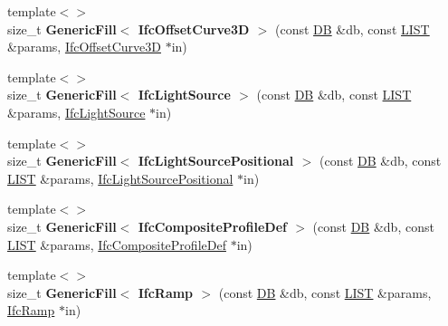 \begin{DoxyCompactItemize}
\item 
\hypertarget{namespace_assimp_1_1_s_t_e_p_a4b07bb8d7784fd60a1053da72e8eb514}{{\footnotesize template$<$$>$ }\\size\+\_\+t {\bfseries Generic\+Fill$<$ Ifc\+Offset\+Curve3\+D $>$} (const \hyperlink{class_assimp_1_1_s_t_e_p_1_1_d_b}{D\+B} \&db, const \hyperlink{class_assimp_1_1_s_t_e_p_1_1_e_x_p_r_e_s_s_1_1_l_i_s_t}{L\+I\+S\+T} \&params, \hyperlink{struct_assimp_1_1_i_f_c_1_1_ifc_offset_curve3_d}{Ifc\+Offset\+Curve3\+D} $\ast$in)}\label{namespace_assimp_1_1_s_t_e_p_a4b07bb8d7784fd60a1053da72e8eb514}

\item 
\hypertarget{namespace_assimp_1_1_s_t_e_p_ad3ce6554ccb2e2461064e4d268cf5f3a}{{\footnotesize template$<$$>$ }\\size\+\_\+t {\bfseries Generic\+Fill$<$ Ifc\+Light\+Source $>$} (const \hyperlink{class_assimp_1_1_s_t_e_p_1_1_d_b}{D\+B} \&db, const \hyperlink{class_assimp_1_1_s_t_e_p_1_1_e_x_p_r_e_s_s_1_1_l_i_s_t}{L\+I\+S\+T} \&params, \hyperlink{struct_assimp_1_1_i_f_c_1_1_ifc_light_source}{Ifc\+Light\+Source} $\ast$in)}\label{namespace_assimp_1_1_s_t_e_p_ad3ce6554ccb2e2461064e4d268cf5f3a}

\item 
\hypertarget{namespace_assimp_1_1_s_t_e_p_a51dc6f038c336469b6a751a313527833}{{\footnotesize template$<$$>$ }\\size\+\_\+t {\bfseries Generic\+Fill$<$ Ifc\+Light\+Source\+Positional $>$} (const \hyperlink{class_assimp_1_1_s_t_e_p_1_1_d_b}{D\+B} \&db, const \hyperlink{class_assimp_1_1_s_t_e_p_1_1_e_x_p_r_e_s_s_1_1_l_i_s_t}{L\+I\+S\+T} \&params, \hyperlink{struct_assimp_1_1_i_f_c_1_1_ifc_light_source_positional}{Ifc\+Light\+Source\+Positional} $\ast$in)}\label{namespace_assimp_1_1_s_t_e_p_a51dc6f038c336469b6a751a313527833}

\item 
\hypertarget{namespace_assimp_1_1_s_t_e_p_a1501504215d16a8c737a0317fb9eb935}{{\footnotesize template$<$$>$ }\\size\+\_\+t {\bfseries Generic\+Fill$<$ Ifc\+Composite\+Profile\+Def $>$} (const \hyperlink{class_assimp_1_1_s_t_e_p_1_1_d_b}{D\+B} \&db, const \hyperlink{class_assimp_1_1_s_t_e_p_1_1_e_x_p_r_e_s_s_1_1_l_i_s_t}{L\+I\+S\+T} \&params, \hyperlink{struct_assimp_1_1_i_f_c_1_1_ifc_composite_profile_def}{Ifc\+Composite\+Profile\+Def} $\ast$in)}\label{namespace_assimp_1_1_s_t_e_p_a1501504215d16a8c737a0317fb9eb935}

\item 
\hypertarget{namespace_assimp_1_1_s_t_e_p_a63ed76d1f0da5c34f6c9775b2e811e81}{{\footnotesize template$<$$>$ }\\size\+\_\+t {\bfseries Generic\+Fill$<$ Ifc\+Ramp $>$} (const \hyperlink{class_assimp_1_1_s_t_e_p_1_1_d_b}{D\+B} \&db, const \hyperlink{class_assimp_1_1_s_t_e_p_1_1_e_x_p_r_e_s_s_1_1_l_i_s_t}{L\+I\+S\+T} \&params, \hyperlink{struct_assimp_1_1_i_f_c_1_1_ifc_ramp}{Ifc\+Ramp} $\ast$in)}\label{namespace_assimp_1_1_s_t_e_p_a63ed76d1f0da5c34f6c9775b2e811e81}


\end{DoxyCompactItemize}
